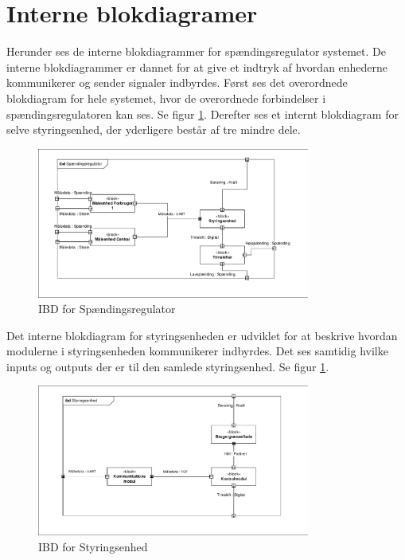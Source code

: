 

\section{Interne blokdiagramer}

Herunder ses de interne blokdiagrammer for spændingsregulator systemet. De interne blokdiagrammer er dannet for at give et indtryk af hvordan enhederne kommunikerer og sender signaler indbyrdes. Først ses det overordnede blokdiagram for hele systemet, hvor de overordnede forbindelser i spændingsregulatoren kan ses. Se figur \ref{fig:IBDSp}. Derefter ses et internt blokdiagram for selve styringsenhed, der yderligere består af tre mindre dele. 

\begin{figure}[htbp] %
	\centering
	\includegraphics[width=0.8\textwidth]{figure/IBDSpaendingsregulator.pdf}
	\caption{IBD for Spændingsregulator}
	\label{fig:IBDSp}
\end{figure}

Det interne blokdiagram for styringsenheden er udviklet for at beskrive hvordan modulerne i styringsenheden kommunikerer indbyrdes. Det ses samtidig hvilke inputs og outputs der er til den samlede styringsenhed. Se figur \ref{fig:IBDSp}. 


\begin{figure}[htbp] %
	\centering
	\includegraphics[width=0.8\textwidth]{figure/IBDStyringsenhed.pdf}
	\caption{IBD for Styringsenhed}
	\label{fig:IBDSt}
\end{figure} 
	 




